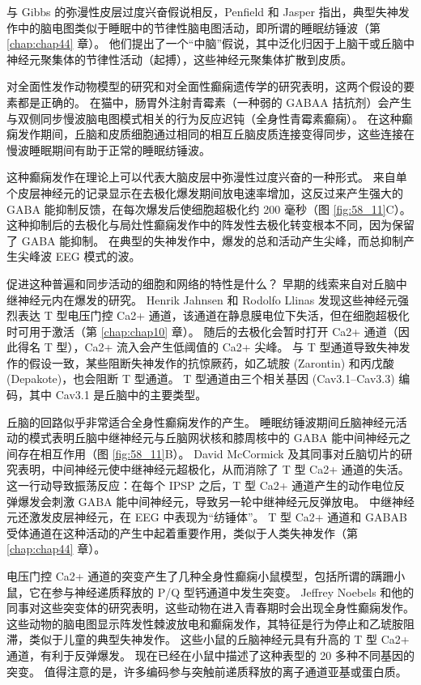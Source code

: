 与 Gibbs 的弥漫性皮层过度兴奋假说相反，Penfield 和 Jasper 指出，典型失神发作中的脑电图类似于睡眠中的节律性脑电图活动，即所谓的睡眠纺锤波（第 \ref{chap:chap44} 章）。 他们提出了一个“中脑”假说，其中泛化归因于上脑干或丘脑中神经元聚集体的节律性活动（起搏），这些神经元聚集体扩散到皮质。

对全面性发作动物模型的研究和对全面性癫痫遗传学的研究表明，这两个假设的要素都是正确的。 在猫中，肠胃外注射青霉素（一种弱的 GABAA 拮抗剂）会产生与双侧同步慢波脑电图模式相关的行为反应迟钝（全身性青霉素癫痫）。 在这种癫痫发作期间，丘脑和皮质细胞通过相同的相互丘脑皮质连接变得同步，这些连接在慢波睡眠期间有助于正常的睡眠纺锤波。

这种癫痫发作在理论上可以代表大脑皮层中弥漫性过度兴奋的一种形式。 来自单个皮层神经元的记录显示在去极化爆发期间放电速率增加，这反过来产生强大的 GABA 能抑制反馈，在每次爆发后使细胞超极化约 200 毫秒（图 \ref{fig:58_11}C）。 这种抑制后的去极化与局灶性癫痫发作中的阵发性去极化转变根本不同，因为保留了 GABA 能抑制。 在典型的失神发作中，爆发的总和活动产生尖峰，而总抑制产生尖峰波 EEG 模式的波。

促进这种普遍和同步活动的细胞和网络的特性是什么？ 早期的线索来自对丘脑中继神经元内在爆发的研究。 Henrik Jahnsen 和 Rodolfo Llinas 发现这些神经元强烈表达 T 型电压门控 Ca2+ 通道，该通道在静息膜电位下失活，但在细胞超极化时可用于激活（第 \ref{chap:chap10} 章）。 随后的去极化会暂时打开 Ca2+ 通道（因此得名 T 型），Ca2+ 流入会产生低阈值的 Ca2+ 尖峰。 与 T 型通道导致失神发作的假设一致，某些阻断失神发作的抗惊厥药，如乙琥胺 (Zarontin) 和丙戊酸 (Depakote)，也会阻断 T 型通道。 T 型通道由三个相关基因 (Cav3.1–Cav3.3) 编码，其中 Cav3.1 是丘脑中的主要类型。

丘脑的回路似乎非常适合全身性癫痫发作的产生。 睡眠纺锤波期间丘脑神经元活动的模式表明丘脑中继神经元与丘脑网状核和膝周核中的 GABA 能中间神经元之间存在相互作用（图 \ref{fig:58_11}B）。 David McCormick 及其同事对丘脑切片的研究表明，中间神经元使中继神经元超极化，从而消除了 T 型 Ca2+ 通道的失活。 这一行动导致振荡反应：在每个 IPSP 之后，T 型 Ca2+ 通道产生的动作电位反弹爆发会刺激 GABA 能中间神经元，导致另一轮中继神经元反弹放电。 中继神经元还激发皮层神经元，在 EEG 中表现为“纺锤体”。 T 型 Ca2+ 通道和 GABAB 受体通道在这种活动的产生中起着重要作用，类似于人类失神发作（第 \ref{chap:chap44} 章）。

电压门控 Ca2+ 通道的突变产生了几种全身性癫痫小鼠模型，包括所谓的蹒跚小鼠，它在参与神经递质释放的 P/Q 型钙通道中发生突变。 Jeffrey Noebels 和他的同事对这些突变体的研究表明，这些动物在进入青春期时会出现全身性癫痫发作。 这些动物的脑电图显示阵发性棘波放电和癫痫发作，其特征是行为停止和乙琥胺阻滞，类似于儿童的典型失神发作。 这些小鼠的丘脑神经元具有升高的 T 型 Ca2+ 通道，有利于反弹爆发。 现在已经在小鼠中描述了这种表型的 20 多种不同基因的突变。 值得注意的是，许多编码参与突触前递质释放的离子通道亚基或蛋白质。

